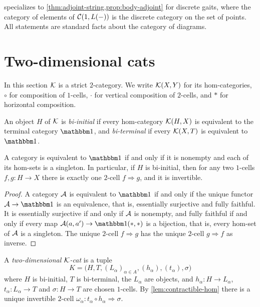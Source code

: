 \begin{remark}\label{rem:gait-honest}
 specializes to \cref{thm:adjoint-string,prop:body-adjoint}
for discrete gaits, where the category of elements of $\mathcal{C}(1,L(-))$ is the
discrete category on the set of points. All statements are standard facts
about the category of diagrams.
\end{remark}

\section{Two-dimensional cats}\label{sec:two-dim}

\begin{assumption}\label{ass:two-dim}
In this section $\mathcal{K}$ is a strict $2$-category. We write $\mathcal{K}(X,Y)$ for its
hom-categories, $\circ$ for composition of $1$-cells, $\cdot$ for vertical
composition of $2$-cells, and $*$ for horizontal composition.
\end{assumption}

\begin{definition}\label{def:bi-initial}
An object $H$ of $\mathcal{K}$ is \emph{bi-initial} if every hom-category $\mathcal{K}(H,X)$ is
equivalent to the terminal category $\one$, and \emph{bi-terminal} if every
$\mathcal{K}(X,T)$ is equivalent to $\one$.
\end{definition}

\begin{lemma}\label{lem:contractible-hom}
A category is equivalent to $\one$ if and only if it is nonempty and each of its
hom-sets is a singleton. In particular, if $H$ is bi-initial, then for any two
$1$-cells $f,g\colon H\to X$ there is exactly one $2$-cell $f\Rightarrow g$,
and it is invertible.
\end{lemma}

\begin{proof}
A category $\mathcal{A}$ is equivalent to $\one$ if and only if the unique functor
$\cA\to\one$ is an equivalence, that is, essentially surjective and fully
faithful. It is essentially surjective if and only if $\mathcal{A}$ is nonempty, and
fully faithful if and only if every map $\cA(a,a')\to\one(*,*)$ is a bijection,
that is, every hom-set of $\mathcal{A}$ is a singleton. The unique $2$-cell $f\Rightarrow g$ has the unique $2$-cell
$g\Rightarrow f$ as inverse.
\end{proof}

\begin{definition}\label{def:two-dim-cat}
A \emph{two-dimensional $\mathcal{K}$-cat} is a tuple
\[
K=\bigl(H,T,(L_\alpha)_{\alpha\in A},(h_\alpha),(t_\alpha),\sigma\bigr)
\]
where $H$ is bi-initial, $T$ is bi-terminal, the $L_\alpha$ are objects, and
$h_\alpha\colon H\to L_\alpha$, $t_\alpha\colon L_\alpha\to T$ and
$\sigma\colon H\to T$ are chosen $1$-cells. By \cref{lem:contractible-hom}
there is a unique invertible $2$-cell $\omega_\alpha\colon t_\alpha\circ h_\alpha\Rightarrow\sigma$.
\end{definition}

